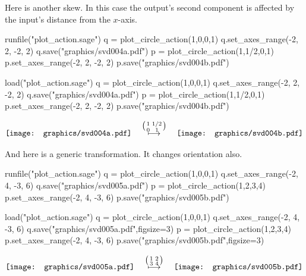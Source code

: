 Here is another skew.
In this case the output's 
second component is affected by the input's distance from 
the $x$-axis.
\begin{sageoutput}[d,0,4;d,5,7]
runfile("plot_action.sage")
q = plot_circle_action(1,0,0,1) 
q.set_axes_range(-2, 2, -2, 2) 
q.save("graphics/svd004a.pdf")
p = plot_circle_action(1,1/2,0,1) 
p.set_axes_range(-2, 2, -2, 2) 
p.save("graphics/svd004b.pdf")
\end{sageoutput}
\begin{sagesilent}
load("plot_action.sage")
q = plot_circle_action(1,0,0,1) 
q.set_axes_range(-2, 2, -2, 2) 
q.save("graphics/svd004a.pdf")
p = plot_circle_action(1,1/2,0,1) 
p.set_axes_range(-2, 2, -2, 2) 
p.save("graphics/svd004b.pdf")
\end{sagesilent}
\begin{equation*}
  \vcenteredhbox{\texttt{[image: graphics/svd004a.pdf]}}
  \quad\mapsunder{\big (\begin{smallmatrix} 1 &1/2 \\ 0 &1 \end{smallmatrix}\big )}\quad
  \vcenteredhbox{\texttt{[image: graphics/svd004b.pdf]}}
\end{equation*}

And here is a generic transformation.
It changes orientation also.
\begin{sageoutput}[d,0,4;d,5,7]
runfile("plot_action.sage")
q = plot_circle_action(1,0,0,1) 
q.set_axes_range(-2, 4, -3, 6) 
q.save("graphics/svd005a.pdf")
p = plot_circle_action(1,2,3,4) 
p.set_axes_range(-2, 4, -3, 6) 
p.save("graphics/svd005b.pdf")
\end{sageoutput}
\begin{sagesilent}
load("plot_action.sage")
q = plot_circle_action(1,0,0,1) 
q.set_axes_range(-2, 4, -3, 6) 
q.save("graphics/svd005a.pdf",figsize=3)
p = plot_circle_action(1,2,3,4) 
p.set_axes_range(-2, 4, -3, 6) 
p.save("graphics/svd005b.pdf",figsize=3)
\end{sagesilent}
\begin{equation*}
  \vcenteredhbox{\texttt{[image: graphics/svd005a.pdf]}}
  \quad\mapsunder{\big (\begin{smallmatrix} 1 &2 \\ 3 &4 \end{smallmatrix}\big )}\quad
  \vcenteredhbox{\texttt{[image: graphics/svd005b.pdf]}}
\end{equation*}



